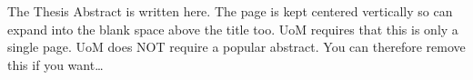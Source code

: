 
\begin{popularabstract}
    \addchaptertocentry{\popularabstractname} %
    The Thesis Abstract is written here. The page is kept centered vertically so can expand into the blank space above the title too. UoM requires that this is only a single page. UoM does {\bcf NOT} require a popular abstract. You can therefore remove this if you want\ldots
\end{popularabstract}
    